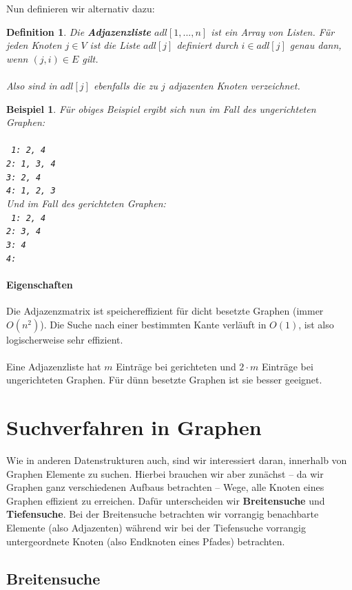 \documentclass[11pt,a4paper]{scrartcl}
\newtheorem{definition}{Definition}
\newtheorem{example}{Beispiel}
\begin{document}
Nun definieren wir alternativ dazu:
\begin{definition}
Die \textbf{Adjazenzliste} $adl[1, ..., n]$ ist ein Array von Listen. Für jeden Knoten $j \in V$ ist die Liste $adl[j]$ definiert durch $i \in adl[j]$ genau dann, wenn $(j, i) \in E$ gilt. \\\\
Also sind in $adl[j]$ ebenfalls die zu $j$ adjazenten Knoten verzeichnet.
\end{definition}
\begin{example}
Für obiges Beispiel ergibt sich nun im Fall des ungerichteten Graphen: \\\\
\texttt{
1: 2, 4 \\
2: 1, 3, 4 \\
3: 2, 4 \\
4: 1, 2, 3}
\\
Und im Fall des gerichteten Graphen: \\
\texttt{
1: 2, 4 \\
2: 3, 4 \\
3: 4 \\
4: }
\end{example}
\paragraph{Eigenschaften}
Die Adjazenzmatrix ist speichereffizient für dicht besetzte Graphen (immer $O(n^{2})$). Die Suche nach einer bestimmten Kante verläuft in $O(1)$, ist also logischerweise sehr effizient. \\\\
Eine Adjazenzliste hat $m$ Einträge bei gerichteten und $2 \cdot m$ Einträge bei ungerichteten Graphen. Für dünn besetzte Graphen ist sie besser geeignet.
\section{Suchverfahren in Graphen}
Wie in anderen Datenstrukturen auch, sind wir interessiert daran, innerhalb von Graphen Elemente zu suchen. Hierbei brauchen wir aber zunächst -- da wir Graphen ganz verschiedenen Aufbaus betrachten -- Wege, alle Knoten eines Graphen effizient zu erreichen. Dafür unterscheiden wir \textbf{Breitensuche} und \textbf{Tiefensuche}. Bei der Breitensuche betrachten wir vorrangig benachbarte Elemente (also Adjazenten) während wir bei der Tiefensuche vorrangig untergeordnete Knoten (also Endknoten eines Pfades) betrachten.
\subsection{Breitensuche}
\end{document}
